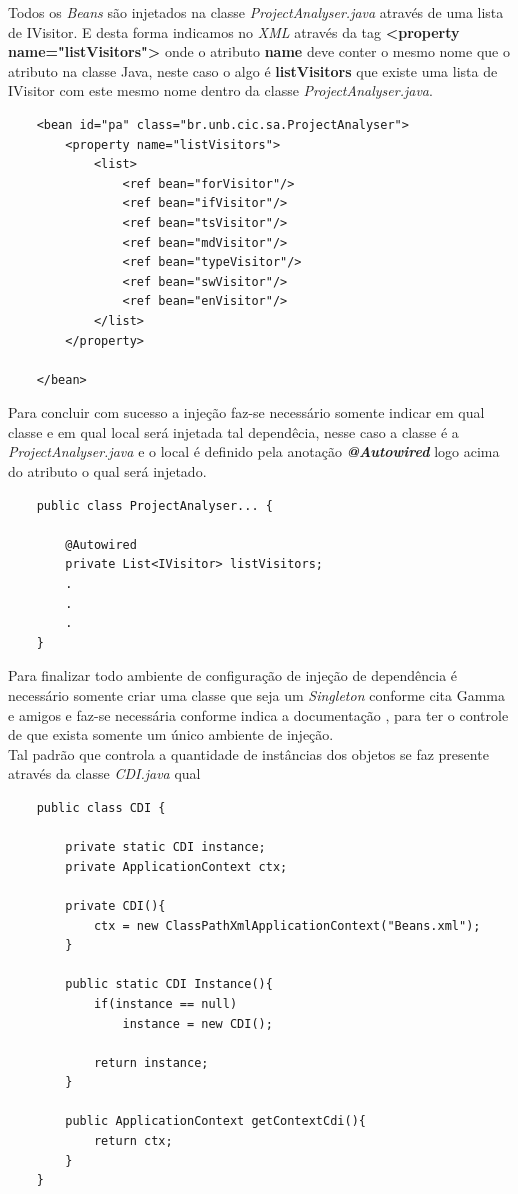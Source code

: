 Todos os {\it Beans} são injetados na classe \textit{ProjectAnalyser.java} através de uma lista de IVisitor. E desta forma indicamos no \textit{XML} através da tag \textbf{<property name="listVisitors">} onde o atributo \textbf{name} deve conter o mesmo nome que o atributo na classe Java,  neste caso o algo é \textbf{listVisitors} que existe uma lista de IVisitor com este mesmo nome dentro da classe \textit{ProjectAnalyser.java}.\\
\begin{lstlisting}
	<bean id="pa" class="br.unb.cic.sa.ProjectAnalyser">
		<property name="listVisitors">
			<list>
				<ref bean="forVisitor"/>
				<ref bean="ifVisitor"/>
				<ref bean="tsVisitor"/>
				<ref bean="mdVisitor"/>
				<ref bean="typeVisitor"/>
				<ref bean="swVisitor"/>
				<ref bean="enVisitor"/>
			</list>
		</property>
	
	</bean>
\end{lstlisting}


Para concluir com sucesso a injeção faz-se necessário somente indicar em qual classe e em qual local será injetada tal dependêcia, nesse caso a classe é a \textit{ProjectAnalyser.java} e o local é definido pela anotação \textbf{\textit{@Autowired}} logo acima do atributo o qual será injetado.\\

\begin{lstlisting}
	public class ProjectAnalyser... {

		@Autowired
		private List<IVisitor> listVisitors;
		.
		.
		.
	}
\end{lstlisting}
\clearpage

Para finalizar todo ambiente de configuração de injeção de dependência é necessário somente criar uma classe que seja um {\it Singleton} \cite{Gamma:1995:DPE:186897} conforme cita Gamma e amigos e faz-se necessária conforme indica a documentação \cite{SPRING_REF}, para ter o controle de que exista somente um único ambiente de injeção.\\
Tal padrão que controla a quantidade de instâncias dos objetos se faz presente através da classe \textit{CDI.java} qual
\begin{lstlisting}
	public class CDI {
	
		private static CDI instance;
		private ApplicationContext ctx;
		
		private CDI(){ 
			ctx = new ClassPathXmlApplicationContext("Beans.xml");
		}
		
		public static CDI Instance(){
			if(instance == null)
				instance = new CDI();
		
			return instance;
		}
		
		public ApplicationContext getContextCdi(){
			return ctx;
		}
	}
\end{lstlisting}

